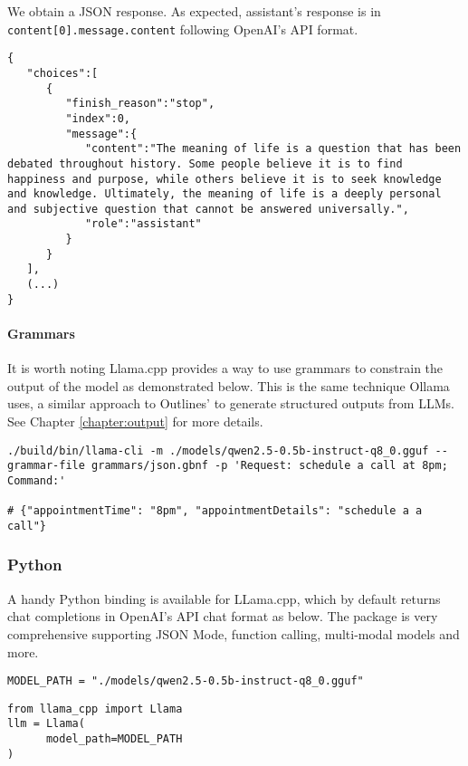 We obtain a JSON response. As expected, assistant's response is in \texttt{content[0].message.content} following OpenAI's API format.

\begin{verbatim}
{
   "choices":[
      {
         "finish_reason":"stop",
         "index":0,
         "message":{
            "content":"The meaning of life is a question that has been debated throughout history. Some people believe it is to find happiness and purpose, while others believe it is to seek knowledge and knowledge. Ultimately, the meaning of life is a deeply personal and subjective question that cannot be answered universally.",
            "role":"assistant"
         }
      }
   ],
   (...)
}
\end{verbatim}

\paragraph{Grammars}

It is worth noting Llama.cpp provides a way to use grammars  to constrain the output of the model as demonstrated below. This is the same technique Ollama uses, a similar approach to Outlines' to generate structured outputs from LLMs. See Chapter \ref{chapter:output} for more details.

\begin{verbatim}
./build/bin/llama-cli -m ./models/qwen2.5-0.5b-instruct-q8_0.gguf --grammar-file grammars/json.gbnf -p 'Request: schedule a call at 8pm; Command:'

# {"appointmentTime": "8pm", "appointmentDetails": "schedule a a call"}
\end{verbatim}

\subsubsection{Python}

A handy Python binding  is available for LLama.cpp, which by default returns chat completions in OpenAI's API chat format as below. The package is very comprehensive supporting JSON Mode, function calling, multi-modal models and more.

\begin{verbatim}
MODEL_PATH = "./models/qwen2.5-0.5b-instruct-q8_0.gguf"
\end{verbatim}

\begin{verbatim}
from llama_cpp import Llama
llm = Llama(
      model_path=MODEL_PATH
)
\end{verbatim}

